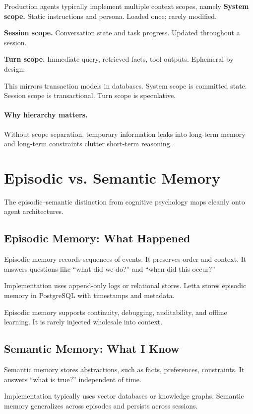Production agents typically implement multiple context scopes, namely \textbf{System scope.}
Static instructions and persona. Loaded once; rarely modified.

\textbf{Session scope.}
Conversation state and task progress. Updated throughout a session.

\textbf{Turn scope.}
Immediate query, retrieved facts, tool outputs. Ephemeral by design.

This mirrors transaction models in databases. System scope is committed state. Session scope is transactional. Turn scope is speculative.

\paragraph{Why hierarchy matters.}
Without scope separation, temporary information leaks into long-term memory and long-term constraints clutter short-term reasoning.

\section{Episodic vs. Semantic Memory}

The episodic–semantic distinction from cognitive psychology maps cleanly onto agent architectures.

\subsection{Episodic Memory: What Happened}

Episodic memory records sequences of events. It preserves order and context. It answers questions like ``what did we do?'' and ``when did this occur?''

Implementation uses append-only logs or relational stores. Letta stores episodic memory in PostgreSQL with timestamps and metadata.

Episodic memory supports continuity, debugging, auditability, and offline learning. It is rarely injected wholesale into context.

\subsection{Semantic Memory: What I Know}

Semantic memory stores abstractions, such as facts, preferences, constraints. It answers ``what is true?'' independent of time.

Implementation typically uses vector databases or knowledge graphs. Semantic memory generalizes across episodes and persists across sessions.

